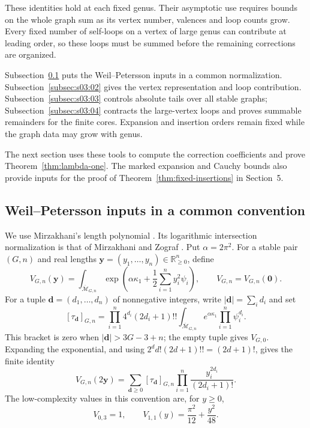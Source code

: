 \documentclass[a4paper,10pt]{article}
\numberwithin{equation}{section}
\newcommand{\MM}{\overline{\mathcal{M}}}
\theoremstyle{paperplain}
\theoremstyle{paperremark}
\theoremstyle{paperplain}
\begin{document}
These identities hold at each fixed genus. Their asymptotic use requires
bounds on the whole graph sum as its vertex number, valences and loop
counts grow. Every fixed number of self-loops on a vertex of large genus
can contribute at leading order, so these loops must be summed before
the remaining corrections are organized.

Subsection~\ref{subsec:s03:01} puts the Weil--Petersson inputs in a
common normalization. Subsection~\ref{subsec:s03:02} gives the vertex
representation and loop contribution. Subsection~\ref{subsec:s03:03}
controls absolute tails over all stable graphs;
Subsection~\ref{subsec:s03:04} contracts the large-vertex loops and
proves summable remainders for the finite cores. Expansion and insertion
orders remain fixed while the graph data may grow with genus.

The next section uses these tools to compute the correction coefficients
and prove Theorem~\ref{thm:lambda-one}. The marked expansion and Cauchy
bounds also provide inputs for the proof of
Theorem~\ref{thm:fixed-insertions} in Section~5.

\subsection{Weil–Petersson inputs in a common convention}
\label{subsec:s03:01}

We use Mirzakhani's length polynomial \cite[Theorem~4.4]{Mir07}.
Its logarithmic intersection normalization is that of Mirzakhani and
Zograf \cite[Section~2]{MZ15}. Put $\alpha=2\pi^2$.
For a stable pair $(G,n)$ and real lengths
$\mathbf y=(y_1,\ldots,y_n)\in\mathbb R_{\geq0}^n$, define
\begin{equation}
\label{eq:s03:wp-definition}
V_{G,n}(\mathbf y)
=\int_{\MM_{G,n}}\exp\left(\alpha\kappa_1+
  \frac12\sum_{i=1}^ny_i^2\psi_i\right),
\qquad V_{G,n}=V_{G,n}(\mathbf0).
\end{equation}
For a tuple $\mathbf d=(d_1,\ldots,d_n)$ of nonnegative integers, write
$|\mathbf d|=\sum_i d_i$ and set
\begin{equation}
\label{eq:s03:descendants}
[\tau_{\mathbf d}]_{G,n}
=\prod_{i=1}^n4^{d_i}(2d_i+1)!!
  \int_{\MM_{G,n}}e^{\alpha\kappa_1}\prod_{i=1}^n\psi_i^{d_i}.
\end{equation}
This bracket is zero when $|\mathbf d|>3G-3+n$; the empty tuple gives
$V_{G,0}$. Expanding the exponential, and using
$2^d d!(2d+1)!!=(2d+1)!$, gives the finite identity
\begin{equation}
\label{eq:s03:length-polynomial}
V_{G,n}(2\mathbf y)
=\sum_{\mathbf d\geq0}[\tau_{\mathbf d}]_{G,n}
  \prod_{i=1}^n\frac{y_i^{2d_i}}{(2d_i+1)!}.
\end{equation}
The low-complexity values in this convention are, for $y\geq0$,
\begin{equation}
\label{eq:s03:low-types}
V_{0,3}=1,\qquad
V_{1,1}(y)=\frac{\pi^2}{12}+\frac{y^2}{48}.
\end{equation}
\end{document}
